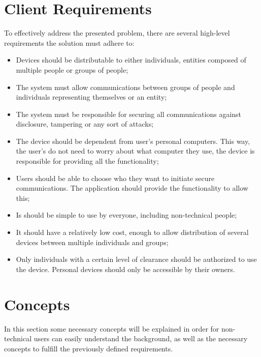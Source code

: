 \section{Client Requirements} \label{chap:problem:requirements}


To effectively address the presented problem, there are several high-level requirements the solution must adhere to:
\begin{itemize}
	\item Devices should be distributable to either individuals, entities composed of multiple people or groups of people;
	\item The system must allow communications between groups of people and individuals representing themselves or an entity;
	\item The system must be responsible for securing all communications against disclosure, tampering or any sort of attacks;
	\item The device should be dependent from user's personal computers. This way, the user's do not need to worry about what computer they use, the device is responsible for providing all the functionality;
	\item Users should be able to choose who they want to initiate secure communications. The application should provide the functionality to allow this;
	\item Is should be simple to use by everyone, including non-technical people;
	\item It should have a relatively low cost, enough to allow distribution of several devices between multiple individuals and groups;
	\item Only individuals with a certain level of clearance should be authorized to use the device. Personal devices should only be accessible by their owners.
\end{itemize}

\section{Concepts} \label{chap:problem:concepts}

In this section some necessary concepts will be explained in order for non-technical users can easily understand the background, as well as the necessary concepts to fulfill the previously defined requirements.

